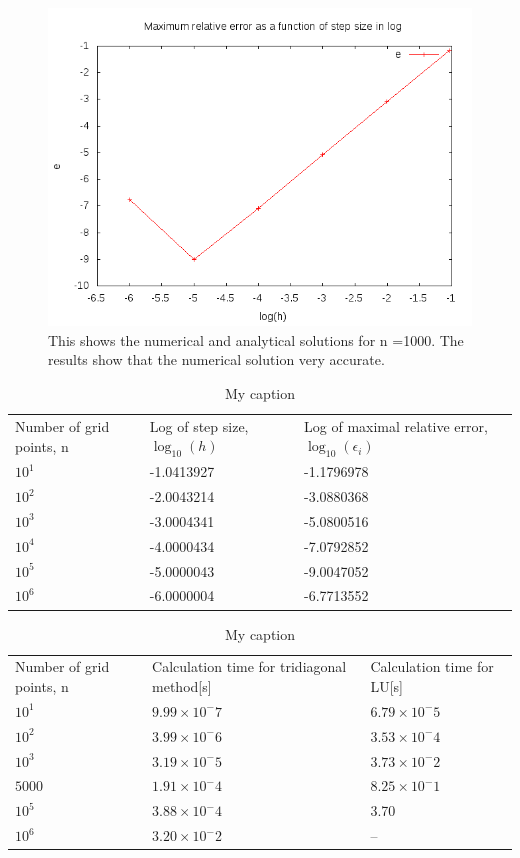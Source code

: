 \documentclass[11pt,a4wide]{article}
\begin{document}
\begin{figure}[H]
\centering
\includegraphics[width=120mm]{log.png}
\caption{This shows the numerical and analytical solutions for n =1000. The results show that the numerical solution very accurate. \label{overflow}}
\end{figure}


\begin{table}[H]
\centering
\label{my-label}
\begin{tabular}{|l|l|l|}
 \cline{1-3}
 Number of grid points, n&  Log of step size, $\log_{10}(h)$ &  Log of maximal relative error, $\log_{10}(\epsilon_i)$   \\ \cline{1-3}
 $10^1$&  -1.0413927&    -1.1796978\\ \cline{1-3}
 $10^2$&  -2.0043214&    -3.0880368\\ \cline{1-3}
 $10^3$&  -3.0004341&     -5.0800516\\ \cline{1-3}
 $10^4$&  -4.0000434&    -7.0792852\\ \cline{1-3}
 $10^5$&  -5.0000043&    -9.0047052\\ \cline{1-3}
 $10^6$&  -6.0000004&     -6.7713552\\ \cline{1-3}
\end{tabular}
\caption{My caption}
\end{table}

\begin{table}[H]
\centering
\label{my-label}
\begin{tabular}{|l|l|l|}
 \cline{1-3}
 Number of grid points, n&  Calculation time for tridiagonal method[s]&  Calculation time for LU[s]  \\ \cline{1-3}
 $10^1$&  $9.99\times10^-7$&   $6.79\times10^-5$\\ \cline{1-3}
 $10^2$&  $3.99\times10^-6$&   $3.53\times10^-4$\\ \cline{1-3}
 $10^3$&  $3.19\times10^-5$&   $3.73\times10^-2$\\ \cline{1-3}
 $5000$&  $1.91\times10^-4$&   $8.25\times10^-1$\\ \cline{1-3}
 $10^5$&  $3.88\times10^-4$&    3.70\\ \cline{1-3}
 $10^6$&  $3.20\times10^-2$&     --\\ \cline{1-3}
\end{tabular}
\caption{My caption}
\end{table}
\end{document}

